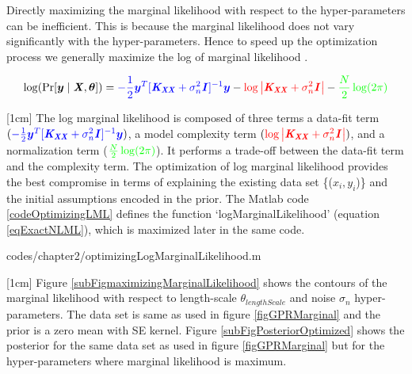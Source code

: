 Directly maximizing the marginal likelihood with respect to the hyper-parameters can be inefficient. This is because the marginal likelihood does not vary significantly with the hyper-parameters. Hence to speed up the optimization process we generally maximize the log of marginal likelihood \cite{Rasmussen2005}. 

  \begin{equation}\label{eqExactNLML}
\log(\Pr[\boldsymbol{y} \mid \bm{\mathit{X}}, \boldsymbol{\theta}]) = \textcolor{blue}{-\frac{1}{2}\boldsymbol{y}^{T}[\bm{\mathit{K_{XX}}} + \sigma^{2}_{n}\bm{\mathit{I}}]^{-1}\boldsymbol{y}} - \textcolor{red}{\log\left |  \bm{\mathit{K_{XX}}} + \sigma^{2}_{n}\bm{\mathit{I}} \right |} - \textcolor{green}{\frac{N}{2}\log(2\pi)}
  \end{equation}

[1cm]
The log marginal likelihood is composed of three terms a data-fit term $( \textcolor{blue}{-\frac{1}{2}\boldsymbol{y}^{T}[\bm{\mathit{K_{XX}}} + \sigma^{2}_{n}\bm{\mathit{I}}]^{-1}\boldsymbol{y}})$, a model complexity term $( \textcolor{red}{\log\left |  \bm{\mathit{K_{XX}}} + \sigma^{2}_{n}\bm{\mathit{I}} \right |})$, and a normalization term ($\textcolor{green}{\frac{N}{2}\log(2\pi)}$). It performs a trade-off between the data-fit term and the complexity term. The optimization of log marginal likelihood provides the best compromise in terms of explaining the existing data set \{($x_{i}, y_{i}$)\} and the initial assumptions encoded in the prior. The Matlab code \ref{codeOptimizingLML} defines the function `logMarginalLikelihood' (equation \ref{eqExactNLML}), which is maximized later in the same code.

\begin{mdframed}[hidealllines=true,backgroundcolor=lightgray!20]

                    {codes/chapter2/optimizingLogMarginalLikelihood.m}
\end{mdframed}

[1cm]
Figure \ref{subFigmaximizingMarginalLikelihood} shows the contours of the marginal likelihood with respect to length-scale $\theta_{lengthScale}$ and noise $\sigma_{n}$ hyper-parameters. The data set is same as used in figure \ref{figGPRMarginal} and the prior is a zero mean with SE kernel. Figure \ref{subFigPosteriorOptimized} shows the posterior for the same data set as used in figure \ref{figGPRMarginal} but for the hyper-parameters where marginal likelihood is maximum. 

